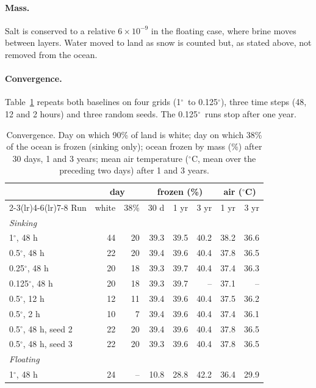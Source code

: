 \documentclass[11pt,a4paper]{article}
\newcommand{\degC}{$^{\circ}$C}
\newcommand{\degree}{$^{\circ}$}
\begin{document}
\paragraph{Mass.} Salt is conserved to a relative $6\times10^{-9}$ in the floating case, where brine moves between layers. Water moved to land as snow is counted but, as stated above, not removed from the ocean.

\paragraph{Convergence.} Table~\ref{tab:conv} repeats both baselines on four grids (1\degree\ to 0.125\degree), three time steps (48, 12 and 2 hours) and three random seeds. The 0.125\degree\ runs stop after one year.

\begin{table}[htbp]
\centering\small
\caption{Convergence. Day on which 90\% of land is white; day on which 38\% of the ocean is frozen (sinking only); ocean frozen by mass (\%) after 30 days, 1 and 3 years; mean air temperature (\degC, mean over the preceding two days) after 1 and 3 years.}
\label{tab:conv}
\setlength{\tabcolsep}{4pt}
\begin{tabular}{lrrrrrrr}
\toprule
& \multicolumn{2}{c}{day} & \multicolumn{3}{c}{frozen (\%)} & \multicolumn{2}{c}{air (\degC)} \\
\cmidrule(lr){2-3}\cmidrule(lr){4-6}\cmidrule(lr){7-8}
Run & white & 38\% & 30 d & 1 yr & 3 yr & 1 yr & 3 yr \\
\midrule
\multicolumn{8}{l}{\emph{Sinking}} \\
1\degree, 48 h & 44 & 20 & 39.3 & 39.5 & 40.2 & 38.2 & 36.6 \\
0.5\degree, 48 h & 22 & 20 & 39.4 & 39.6 & 40.4 & 37.8 & 36.5 \\
0.25\degree, 48 h & 20 & 18 & 39.3 & 39.7 & 40.4 & 37.4 & 36.3 \\
0.125\degree, 48 h & 20 & 18 & 39.3 & 39.7 & -- & 37.1 & -- \\
0.5\degree, 12 h & 12 & 11 & 39.4 & 39.6 & 40.4 & 37.5 & 36.2 \\
0.5\degree, 2 h & 10 & 7 & 39.4 & 39.6 & 40.4 & 37.4 & 36.1 \\
0.5\degree, 48 h, seed 2 & 22 & 20 & 39.4 & 39.6 & 40.4 & 37.8 & 36.5 \\
0.5\degree, 48 h, seed 3 & 22 & 20 & 39.3 & 39.6 & 40.4 & 37.8 & 36.5 \\
\multicolumn{8}{l}{\emph{Floating}} \\
1\degree, 48 h & 24 & -- & 10.8 & 28.8 & 42.2 & 36.4 & 29.9 \\

\end{tabular}
\end{table}
\end{document}
